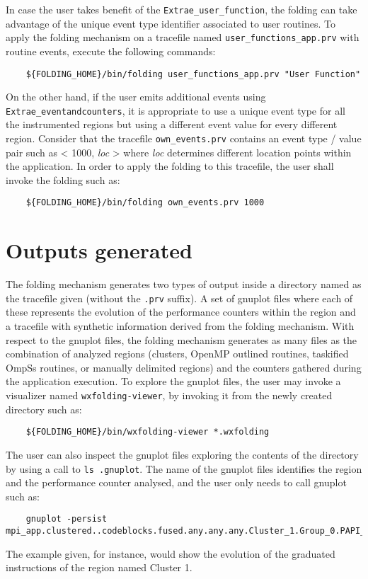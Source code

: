 In case the user takes benefit of the \texttt{Extrae\_user\_function}, the folding can take advantage of the unique event type identifier associated to user routines.
To apply the folding mechanism on a tracefile named \texttt{user\_functions\_app.prv} with routine events, execute the following commands:
\begin{verbatim}
	${FOLDING_HOME}/bin/folding user_functions_app.prv "User Function"
\end{verbatim}

On the other hand, if the user emits additional events using \texttt{Extrae\_eventandcounters}, it is appropriate to use a unique event type for all the instrumented regions but using a different event value for every different region.
Consider that the tracefile \texttt{own\_events.prv} contains an event type / value pair such as < 1000, \textit{loc} > where \textit{loc} determines different location points within the application.
In order to apply the folding to this tracefile, the user shall invoke the folding such as:
\begin{verbatim}
	${FOLDING_HOME}/bin/folding own_events.prv 1000
\end{verbatim}

\section{Outputs generated}\label{sec:Q_visualization_results}

The folding mechanism generates two types of output inside a directory named as the tracefile given (without the \texttt{.prv} suffix).
A set of gnuplot files where each of these represents the evolution of the performance counters within the region and a \PARAVER tracefile with synthetic information derived from the folding mechanism.
With respect to the gnuplot files, the folding mechanism generates as many files as the combination of analyzed regions (clusters, OpenMP outlined routines, taskified OmpSs routines, or manually delimited regions) and the counters gathered during the application execution.
To explore the gnuplot files, the user may invoke a visualizer named \texttt{wxfolding-viewer}, by invoking it from the newly created directory such as:
\begin{verbatim}
	${FOLDING_HOME}/bin/wxfolding-viewer *.wxfolding
\end{verbatim}

The user can also inspect the gnuplot files exploring the contents of the directory by using a call to \texttt{ls \*.gnuplot}.
The name of the gnuplot files identifies the region and the performance counter analysed, and the user only needs to call gnuplot such as:
\begin{verbatim}
	gnuplot -persist mpi_app.clustered..codeblocks.fused.any.any.any.Cluster_1.Group_0.PAPI_TOT_INS.gnuplot
\end{verbatim}
The example given, for instance, would show the evolution of the graduated instructions of the region named Cluster 1.


